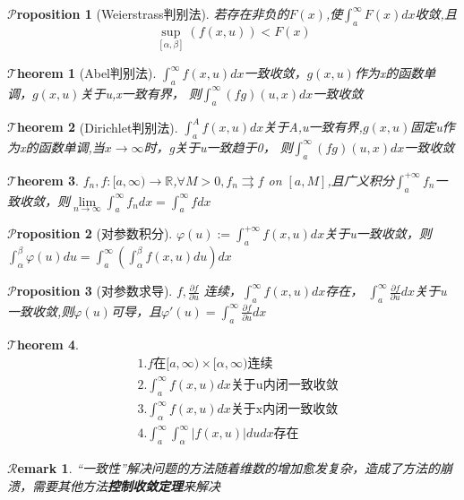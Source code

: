 \documentclass[hyperfer,UTF8,a4paper,12pt]{article}
\theoremstyle{plain}
\newtheorem{Thm}{$\mathcal{T}$heorem}
\newtheorem*{Prop}{$\mathcal{P}$roposition}
\newtheorem*{Remark}{$\mathcal{R}$emark}
\begin{document}
\begin{Prop}[Weierstrass判别法]
	若存在非负的$ F(x) $,使$ \int_{a}^{\infty}F(x)dx $收敛,且
	\[ \sup\limits_{[\alpha,\beta]}(f(x,u))<F(x) \]
\end{Prop}


\begin{Thm}[Abel判别法]
	$ \int_{a}^{\infty}f(x,u)dx $一致收敛，$ g(x,u) $作为x的函数单调，$ g(x,u) $关于u,x一致有界，
	则$ \int_{a}^{\infty}(fg)(u,x)dx $一致收敛
\end{Thm}

\begin{Thm}[Dirichlet判别法]
	$ \int_{a}^{A}f(x,u)dx $关于A,u一致有界,$ g(x,u) $固定u作为x的函数单调,当$ x\to \infty $时，g关于u一致趋于0，
	则$ \int_{a}^{\infty}(fg)(u,x)dx $一致收敛
\end{Thm}

\begin{Thm}
	$ f_n,f:[a,\infty)\to\mathbb{R}$,$ \forall M>0,f_n\rightrightarrows f  $ on $ [a,M] $,且广义积分$\int_{a}^{+\infty}f_n  $一致收敛，则$ \lim\limits_{n\to\infty}\int_{a}^{\infty}f_ndx=\int_{a}^{\infty}fdx $
\end{Thm}

\begin{Prop}[对参数积分]
	$ \varphi(u):=\int_{a}^{+\infty}f(x,u)dx $关于u一致收敛，则$ \int_{\alpha}^{\beta}\varphi(u)du=\int_{a}^{\infty}(\int_{\alpha}^{\beta}f(x,u)du)dx $
\end{Prop}

\begin{Prop}[对参数求导]
	$ f,\frac{\partial f}{\partial u}$
	连续，$\int_{a}^{\infty}f(x,u)dx$存在，
	$\int_{a}^{\infty}\frac{\partial f}{\partial u}dx  $关于u一致收敛,则$ \varphi(u) $可导，且$ \varphi'(u)=\int_{a}^{\infty}\frac{\partial f}{\partial u}dx $
\end{Prop}

\begin{Thm}
	\begin{align*}
		&1.f\textrm{在}[a,\infty)\times[\alpha,\infty)\textrm{连续}\\
		&2.\int_{a}^{\infty}f(x,u)dx\textrm{关于u内闭一致收敛}\\
		&3.\int_{\alpha}^{\infty}f(x,u)dx\textrm{关于x内闭一致收敛}\\
		&4.\int_{a}^{\infty}\int_{\alpha}^{\infty}|f(x,u)|dudx\textrm{存在}
	\end{align*}
\end{Thm}
\begin{Remark}
	“一致性”解决问题的方法随着维数的增加愈发复杂，造成了方法的崩溃，需要其他方法\textbf{控制收敛定理}来解决
\end{Remark}
\end{document}
